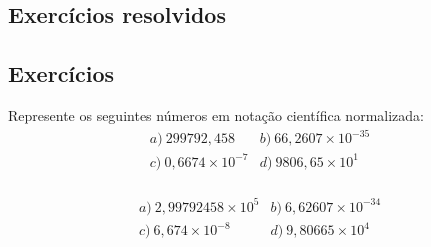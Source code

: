 \subsection*{Exercícios resolvidos}

\emconstrucao

\subsection*{Exercícios}

\begin{exer}\label{exer:notacao_cientifica_normalizada}
  Represente os seguintes números em notação científica normalizada:
  \begin{equation*}
    \begin{array}{ll}
      a)~299792,458 & b)~66,2607\times 10^{-35}\\
      c)~0,6674\times 10^{-7} & d)~9806,65\times 10^{1}
    \end{array}
  \end{equation*}
  \begin{eqnarray*}
  \end{eqnarray*}
\end{exer}
\begin{resp}
  \begin{equation*}
  \begin{array}{ll}
    a)~2,99792458\times 10^5 & b)~6,62607\times 10^{-34}\\
    c)~6,674\times 10^{-8} & d)~9,80665\times 10^4
  \end{array}
  \end{equation*}
\end{resp}

